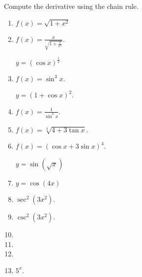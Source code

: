 Compute the derivative using the chain rule.
\begin{multicols}{2}
\begin{enumerate}[ref={\fcProblemRef}]
\item   $\displaystyle f(x)=\sqrt{1+x^2}$

\item\label{problemDifferentialtexDivsqrt(1+2divx^2)}  $\displaystyle  f(x)=\frac{x }{\sqrt{1+\frac{2}{x^2}}}$.

 \label{problemd/dx((cosx)^(1/2))} $y = (\cos x)^{\frac{1}{2}}$


\item $\displaystyle f(x)=\sin^3 x$.

 \label{problemd/dx((1+cosx)^2)}  $y = (1+\cos x)^2$.


\item   $\displaystyle f(x)=\frac{1}{\sin^3x}$.

\item  $\displaystyle f(x)= \sqrt[3]{4+3\tan x}$.

\item  $f(x)=(\cos x + 3\sin x)^4$.


 \label{problemd/dx(sin(sqrt(x)))}  $\displaystyle y = \sin \left( \sqrt{x}\right)$

\item  $y = \cos\left( 4x\right)$


\item $\sec^2 (3x^2)$. 


\item $\csc^2 (3x^2)$. 

\item  
\item  
\item  
\item $5^{x}$.


\end{enumerate}
\end{multicols}
